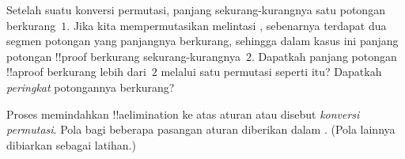 \documentclass[../../../include/open-logic-section]{subfiles}
\begin{document}
\begin{prob}
Setelah suatu konversi permutasi, panjang sekurang-kurangnya satu potongan
berkurang~$1$. Jika kita mempermutasikan \Elim{\land} melintasi
\Elim{\lor}, sebenarnya terdapat dua segmen potongan yang panjangnya
berkurang, sehingga dalam kasus ini panjang potongan !!{proof} berkurang
sekurang-kurangnya~$2$. Dapatkah panjang potongan !!a{proof} berkurang lebih
dari~$2$ melalui satu permutasi seperti itu? Dapatkah \emph{peringkat}
potongannya berkurang?
\end{prob}

Proses memindahkan !!a{elimination} ke atas aturan \Elim{\lor} atau
\Elim{\lexists} disebut \emph{konversi permutasi}. Pola bagi beberapa
pasangan aturan diberikan dalam .
(Pola lainnya dibiarkan sebagai latihan.)
\end{document}
